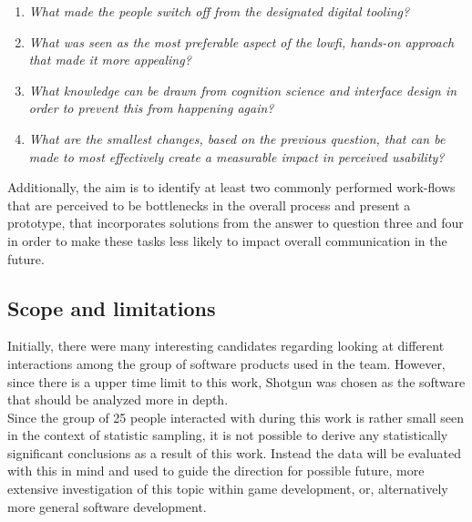   \begin{enumerate}
    \item{
        \textit{
          What made the people switch off from the designated digital tooling?
        }
      }
    \item{
        \textit{
          What was seen as the most preferable aspect of the lowfi, hands-on
          approach that made it more appealing?
        }
      }
    \item{
        \textit{
          What knowledge can be drawn from cognition science and interface
          design in order to prevent this from happening again?
        }
      }
    \item{
        \textit{
          What are the smallest changes, based on the previous question, that
          can be made to most effectively create a measurable impact in
          perceived usability?
        }
      }
  \end{enumerate}

  Additionally, the aim is to identify at least two commonly performed
  work-flows that are perceived to be bottlenecks in the overall process and
  present a prototype, that incorporates solutions from the answer to question
  three and four in order to make these tasks less likely to impact
  overall communication in the future.

  \newpage

%
%

\subsection{Scope and limitations}


  Initially, there were many interesting candidates regarding looking at
  different interactions among the group of software products used in the team.
  However, since there is a upper time limit to this work,
  Shotgun\cite{c_product_shotgun} was chosen as the software that should be
  analyzed more in depth. \\

  Since the group of 25 people interacted with during this work is rather small
  seen in the context of statistic sampling, it is not possible to
  derive any statistically significant conclusions as a result of this work.
  Instead the data will be evaluated with this in mind and used to guide the
  direction for possible future, more extensive investigation of this topic
  within game development, or, alternatively more general software development.\\


